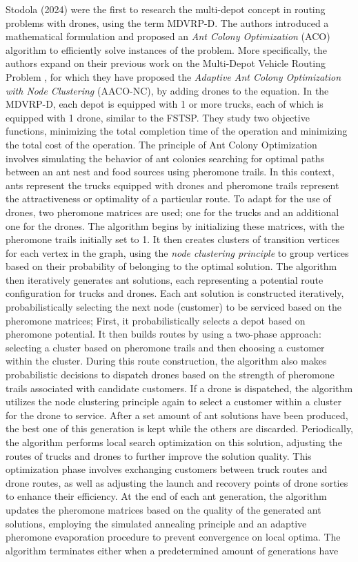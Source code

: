 \documentclass{article}
\begin{document}
	\par 
	Stodola (2024) \cite{Stodola2024} were the first to research the multi-depot concept in routing problems with drones, using the term MDVRP-D. The authors introduced a mathematical formulation and proposed an \textit{Ant Colony Optimization} (ACO) algorithm to efficiently solve instances of the problem. More specifically, the authors expand on their previous work on the Multi-Depot Vehicle Routing Problem \cite{Stodola2022}, for which they have proposed the \textit{Adaptive Ant Colony Optimization with Node Clustering} (AACO-NC), by adding drones to the equation. In the MDVRP-D, each depot is equipped with 1 or more trucks, each of which is equipped with 1 drone, similar to the FSTSP. They study two objective functions, minimizing the total completion time of the operation and minimizing the total cost of the operation. The principle of Ant Colony Optimization involves simulating the behavior of ant colonies searching for optimal paths between an ant nest and food sources using pheromone trails. In this context, ants represent the trucks equipped with drones and pheromone trails represent the attractiveness or optimality of a particular route. To adapt for the use of drones, two pheromone matrices are used; one for the trucks and an additional one for the drones. The algorithm begins by initializing these matrices, with the pheromone trails initially set to 1. It then creates clusters of transition vertices for each vertex in the graph, using the \textit{node clustering principle} \cite{Stodola2020} to group vertices based on their probability of belonging to the optimal solution. The algorithm then iteratively generates ant solutions, each representing a potential route configuration for trucks and drones. Each ant solution is constructed iteratively, probabilistically selecting the next node (customer) to be serviced based on the pheromone matrices; First, it probabilistically selects a depot based on pheromone potential. It then builds routes by using a two-phase approach: selecting a cluster based on pheromone trails and then choosing a customer within the cluster. During this route construction, the algorithm also makes probabilistic decisions to dispatch drones based on the strength of pheromone trails associated with candidate customers. If a drone is dispatched, the algorithm utilizes the node clustering principle again to select a customer within a cluster for the drone to service. After a set amount of ant solutions have been produced, the best one of this generation is kept while the others are discarded. Periodically, the algorithm performs local search optimization on this solution, adjusting the routes of trucks and drones to further improve the solution quality. This optimization phase involves exchanging customers between truck routes and drone routes, as well as adjusting the launch and recovery points of drone sorties to enhance their efficiency. At the end of each ant generation, the algorithm updates the pheromone matrices based on the quality of the generated ant solutions, employing the simulated annealing principle and an adaptive pheromone evaporation procedure to prevent convergence on local optima. The algorithm terminates either when a predetermined amount of generations have 
\end{document}
